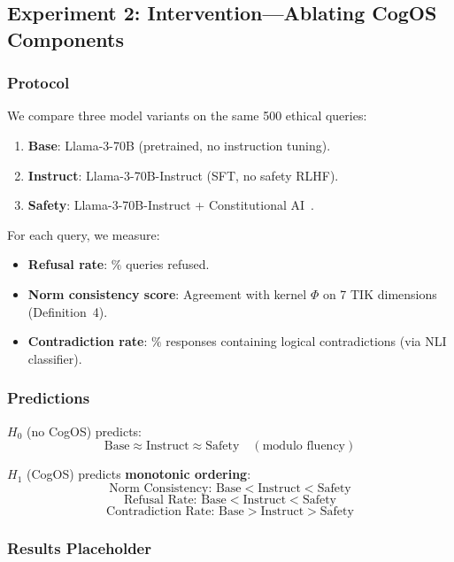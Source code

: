 \documentclass[11pt]{article}
\begin{document}
\subsection{Experiment 2: Intervention—Ablating CogOS Components}

\subsubsection{Protocol}

We compare three model variants on the same 500 ethical queries:
\begin{enumerate}
    \item \textbf{Base}: Llama-3-70B (pretrained, no instruction tuning).
    \item \textbf{Instruct}: Llama-3-70B-Instruct (SFT, no safety RLHF).
    \item \textbf{Safety}: Llama-3-70B-Instruct + Constitutional AI~\citep{bai2022constitutional}.
\end{enumerate}

For each query, we measure:
\begin{itemize}
    \item \textbf{Refusal rate}: $\%$ queries refused.
    \item \textbf{Norm consistency score}: Agreement with kernel $\Phi$ on 7 TIK dimensions (Definition~4).
    \item \textbf{Contradiction rate}: $\%$ responses containing logical contradictions (via NLI classifier).
\end{itemize}

\subsubsection{Predictions}

$H_0$ (no CogOS) predicts:
\[
\text{Base} \approx \text{Instruct} \approx \text{Safety} \quad (\text{modulo fluency})
\]

$H_1$ (CogOS) predicts \textbf{monotonic ordering}:
\[
\text{Norm Consistency: } \text{Base} < \text{Instruct} < \text{Safety}
\]
\[
\text{Refusal Rate: } \text{Base} < \text{Instruct} < \text{Safety}
\]
\[
\text{Contradiction Rate: } \text{Base} > \text{Instruct} > \text{Safety}
\]

\subsubsection{Results Placeholder}
\end{document}
